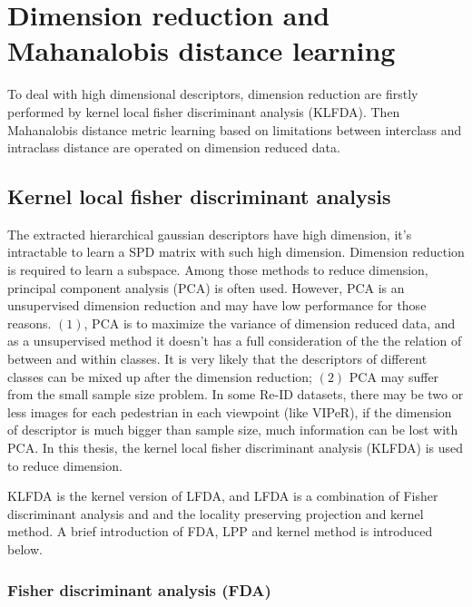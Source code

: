 \chapter{Dimension reduction and Mahanalobis distance learning}
To deal with high dimensional descriptors, dimension reduction are firstly performed by kernel local fisher discriminant analysis (KLFDA). Then Mahanalobis distance metric learning based on limitations between interclass and intraclass distance are operated on dimension reduced data.
\section{Kernel local fisher discriminant analysis}
The extracted hierarchical gaussian descriptors have high dimension, it's intractable to learn a SPD matrix with such high dimension. Dimension reduction is required to learn a subspace.
Among those methods to reduce dimension, principal component analysis (PCA) is often used. However, PCA is an unsupervised dimension reduction and may have low performance for those reasons. $(1)$, PCA is to maximize the variance of dimension reduced data, and as a unsupervised method it doesn't has a full consideration of the the relation of between and within classes. It is very likely that the descriptors of different classes can be mixed up after the dimension reduction; $(2)$ PCA may suffer from the small sample size problem. In some Re-ID datasets, there may be two or less images for each pedestrian in each viewpoint (like VIPeR), if the dimension of descriptor is much bigger than sample size, much information can be lost with PCA. In this thesis, the kernel local fisher discriminant analysis (KLFDA) is used to reduce dimension. 

KLFDA is the kernel version of LFDA, and LFDA is a combination of Fisher discriminant analysis \cite{LFDA} and and the locality preserving projection \cite{LPP} and kernel method. A brief introduction of FDA, LPP and kernel method is introduced below.
\subsection{Fisher discriminant analysis (FDA)}

